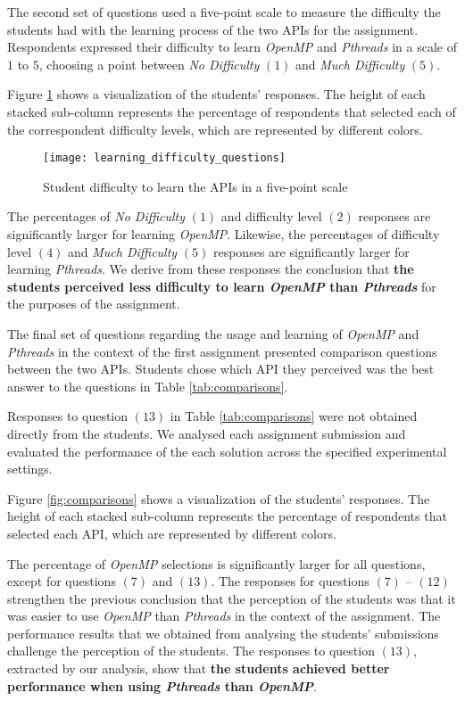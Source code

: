 The second set of questions used a five-point scale to measure the difficulty
the students had with the learning process of the two APIs for the assignment.
Respondents expressed their difficulty to learn \textit{OpenMP} and
\textit{Pthreads} in a scale of $1$ to $5$, choosing a point between \textit{No
Difficulty} $(1)$ and \textit{Much Difficulty} $(5)$.

Figure \ref{fig:learning} shows a visualization of the students' responses.
The height of each stacked sub-column represents the percentage of respondents
that selected each of the correspondent difficulty levels, which are
represented by different colors.

\begin{figure}[htpb]
    \centering
    \texttt{[image: learning\_difficulty\_questions]}
    \caption{Student difficulty to learn the APIs in a five-point scale}
    \label{fig:learning}
\end{figure}

The percentages of \textit{No Difficulty} $(1)$ and difficulty level $(2)$
responses are significantly larger for learning \textit{OpenMP}. Likewise, the
percentages of difficulty level $(4)$ and \textit{Much Difficulty} $(5)$
responses are significantly larger for learning \textit{Pthreads}.  We derive
from these responses the conclusion that \textbf{the students perceived less
difficulty to learn \textit{OpenMP} than \textit{Pthreads}} for the purposes of
the assignment.

The final set of questions regarding the usage and learning of \textit{OpenMP}
and \textit{Pthreads} in the context of the first assignment presented
comparison questions between the two APIs. Students chose which API they
perceived was the best answer to the questions in Table \ref{tab:comparisons}.

Responses to question $(13)$ in Table \ref{tab:comparisons} were not obtained
directly from the students. We analysed each assignment submission and
evaluated the performance of the each solution across the specified
experimental settings.

Figure \ref{fig:comparisons} shows a visualization of the students' responses.
The height of each stacked sub-column represents the percentage of respondents
that selected each API, which are represented by different colors.

The percentage of \textit{OpenMP} selections is significantly larger for all
questions, except for questions $(7)$ and $(13)$. The responses for questions
$(7)$ -- $(12)$ strengthen the previous conclusion that the perception of the
students was that it was easier to use \textit{OpenMP} than \textit{Pthreads}
in the context of the assignment. The performance results that we obtained from
analysing the students' submissions challenge the perception of the students.
The responses to question $(13)$, extracted by our analysis, show that
\textbf{the students achieved better performance when using \textit{Pthreads}
than \textit{OpenMP}}.

